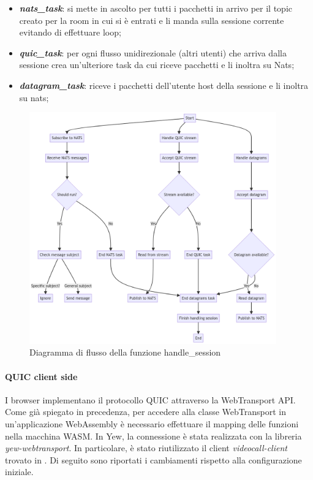 \documentclass{article}
\begin{document}
\begin{itemize}
  \item \textbf{\textit{nats\_task}}: si mette in ascolto per tutti i pacchetti in arrivo 
    per il topic creato per la room in cui si è entrati e li manda sulla sessione corrente
    evitando di effettuare loop;
  \item \textbf{\textit{quic\_task}}: per ogni flusso unidirezionale (altri utenti)
    che arriva dalla sessione crea un'ulteriore task da cui riceve pacchetti e li inoltra su Nats;
  \item \textbf{\textit{datagram\_task}}: riceve i pacchetti dell'utente host della sessione 
    e li inoltra su nats;
\end{itemize}
\begin{figure}
  \begin{center}
    \includegraphics[width=0.95\textwidth]{./figures/handle_session_fwc.png}
  \end{center}
  \caption{Diagramma di flusso della funzione handle\_session}\label{fig:flowchart-handle-session}
\end{figure}

\paragraph{QUIC client side} I browser implementano il protocollo QUIC attraverso la 
WebTransport API. Come già spiegato in precedenza, per accedere alla classe WebTransport in 
un'applicazione WebAssembly è necessario effettuare il mapping delle funzioni nella macchina 
WASM. In Yew, la connessione è stata realizzata con la libreria \textit{yew-webtransport}. 
In particolare, è stato riutilizzato il client \textit{videocall-client} trovato in 
\cite{VideoCallRs}. Di seguito sono riportati i cambiamenti rispetto alla configurazione 
iniziale. 
\end{document}

